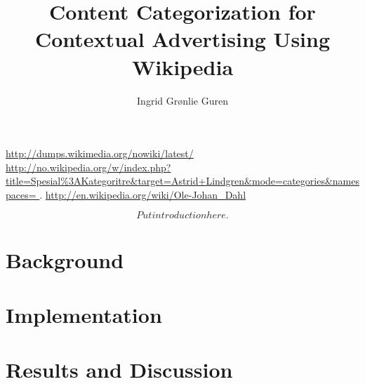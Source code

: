 \documentclass[a4paper,english]{book}
\title{Content Categorization for Contextual Advertising Using Wikipedia}
\author{Ingrid Grønlie Guren}
\begin{document}
\ififorside{}
\frontmatter{}
\maketitle{}


\urldef\nowikidump\url{http://dumps.wikimedia.org/nowiki/latest/}
\urldef\categorytree\url{http://no.wikipedia.org/w/index.php?title=Spesial%3AKategoritre&target=Astrid+Lindgren&mode=categories&namespaces= }.
\urldef\olejohandahleng\url{http://en.wikipedia.org/wiki/Ole-Johan_Dahl}




\tableofcontents{}
\listoffigures{}
\listoftables{}

  
\mainmatter{}



\[ Put introduction here. \]
\part{Background}





\part{Implementation}

\part{Results and Discussion}




\end{document}
